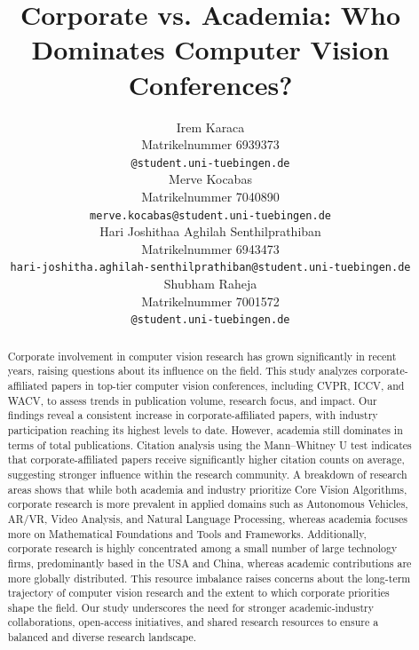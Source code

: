 \documentclass{article}
\title{Corporate vs. Academia: Who Dominates Computer Vision Conferences?}
\author{%
  Irem Karaca\\
  Matrikelnummer 6939373\\
  \texttt{@student.uni-tuebingen.de} \\
  \And
  Merve Kocabas\\
  Matrikelnummer 7040890\\
  \texttt{merve.kocabas@student.uni-tuebingen.de} \\
  \And
  Hari Joshithaa Aghilah Senthilprathiban\\
  Matrikelnummer 6943473\\
  \texttt{hari-joshitha.aghilah-senthilprathiban@student.uni-tuebingen.de} \\
  \And
  Shubham Raheja\\
  Matrikelnummer 7001572\\
  \texttt{@student.uni-tuebingen.de} \\
}
\begin{document}
\maketitle

\begin{abstract}

  Corporate involvement in computer vision research has grown significantly in recent years, raising questions about its influence on the field. This study analyzes corporate-affiliated papers in top-tier computer vision conferences, including CVPR, ICCV, and WACV, to assess trends in publication volume, research focus, and impact. Our findings reveal a consistent increase in corporate-affiliated papers, with industry participation reaching its highest levels to date. However, academia still dominates in terms of total publications. Citation analysis using the Mann–Whitney U test indicates that corporate-affiliated papers receive significantly higher citation counts on average, suggesting stronger influence within the research community. A breakdown of research areas shows that while both academia and industry prioritize Core Vision Algorithms, corporate research is more prevalent in applied domains such as Autonomous Vehicles, AR/VR, Video Analysis, and Natural Language Processing, whereas academia focuses more on Mathematical Foundations and Tools and Frameworks. Additionally, corporate research is highly concentrated among a small number of large technology firms, predominantly based in the USA and China, whereas academic contributions are more globally distributed. This resource imbalance raises concerns about the long-term trajectory of computer vision research and the extent to which corporate priorities shape the field. Our study underscores the need for stronger academic-industry collaborations, open-access initiatives, and shared research resources to ensure a balanced and diverse research landscape. 
\end{abstract}

\end{document}
